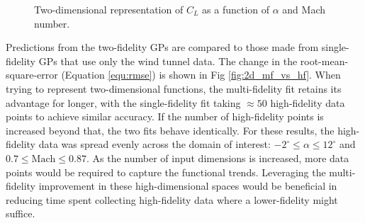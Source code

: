 \begin{figure}
    \centering
    \begin{subfigure}[AVL and wind tunnel data points.] {
        \label{fig:cl_2d_2f_points}
        \texttt{[image: code/image\_gen/nasa\_crm/images/cl\_2d\_2f\_points.png]} }
    \end{subfigure}
    \hfill
    \begin{subfigure}[Surfaces representing mean and $2\sigma$ predictions from GP. Red slice shows one-dimensional location for sampling the GP which is shown in \subref{fig:cl_2d_2f_sample}.]{
        \label{fig:cl_2d_2f_surf}
        \texttt{[image: code/image\_gen/nasa\_crm/images/cl\_2d\_2f\_surf.png]} 
    }
    \end{subfigure}
    \hfill
    \begin{subfigure}[Zoomed in view of surfaces in \subref{fig:cl_2d_2f_surf} at high angles of attack (and lower Mach number). The mean and $2\sigma$ predictions interval surfaces are more discernible at this scale.]{
        \label{fig:cl_2d_2f_surf_zoom}
        \texttt{[image: code/image\_gen/nasa\_crm/images/cl\_2d\_2f\_surf\_zoom.png]} 
    }
    \end{subfigure}
    \hfill
    \begin{subfigure}[One-dimensional representation of mean and $2\sigma$ estimates at slice location shown in \subref{fig:cl_2d_2f_surf}. Multiple samples (colored lines) of the GP are also overlaid to show examples of deterministic sampling. Inset plot focuses in on high angles of attack.]{
        \label{fig:cl_2d_2f_sample}
        \texttt{[image: code/image\_gen/nasa\_crm/images/cl\_2d\_2f\_sample.png]} 
    }
    \end{subfigure}
    \caption{Two-dimensional representation of $C_L$ as a function of $\alpha$ and Mach number.\label{fig:2d_2f_cl_data}}
\end{figure}

Predictions from the two-fidelity GPs are compared to those made from single-fidelity GPs that use only the wind tunnel data. The change in the root-mean-square-error (Equation \eqref{equ:rmse}) is shown in Fig \ref{fig:2d_mf_vs_hf}. When trying to represent two-dimensional functions, the multi-fidelity fit retains its advantage for longer, with the single-fidelity fit taking $\approx 50$ high-fidelity data points to achieve similar accuracy. If the number of high-fidelity points is increased beyond that, the two fits behave identically. For these results, the high-fidelity data was spread evenly across the domain of interest: $-2^\circ \leq \alpha \leq 12^\circ$ and $0.7 \leq \text{Mach} \leq 0.87$. As the number of input dimensions is increased, more data points would be required to capture the functional trends. Leveraging the multi-fidelity improvement in these high-dimensional spaces would be beneficial in reducing time spent collecting high-fidelity data where a lower-fidelity might suffice.

